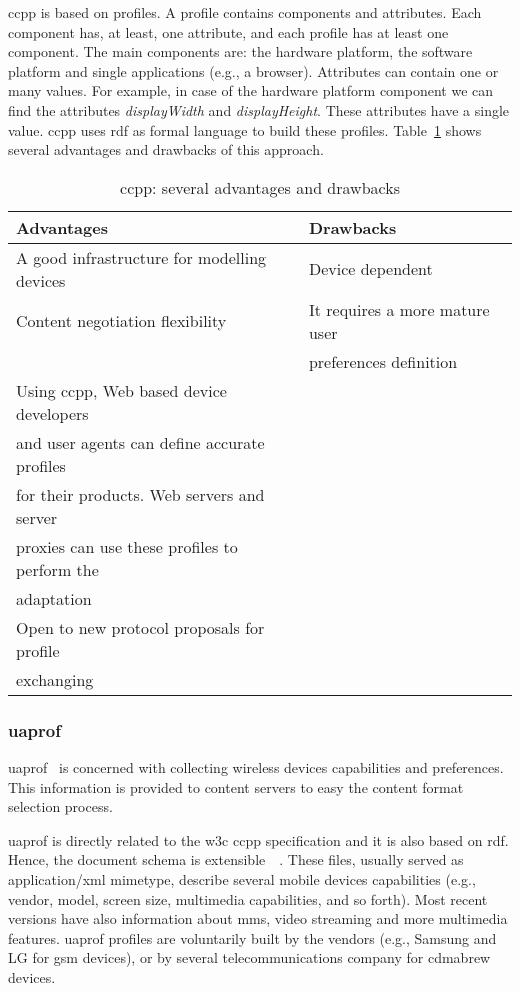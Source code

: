 \ac{ccpp} is based on profiles. A profile contains components and attributes.
Each component has, at least, one attribute, and each profile has at least one
component. The main components are: the hardware platform, the software platform
and single applications (e.g., a browser). Attributes can contain one or many 
values. For example, in case of the hardware platform component we can find the 
attributes \textit{displayWidth} and \textit{displayHeight}. These attributes 
have a single value. \ac{ccpp} uses \ac{rdf} as formal language to build these 
profiles. Table~\ref{tbl:ccpp} shows several advantages and drawbacks of this 
approach.



\begin{table}
\caption{\ac{ccpp}: several advantages and drawbacks}
\label{tbl:ccpp}
\footnotesize
\centering
\begin{tabular}{l l}
  \hline
  \textbf{Advantages}				& \textbf{Drawbacks}			\\
  \hline
  A good infrastructure for modelling devices 	& Device dependent 			\\
  Content negotiation flexibility 		& It requires a more mature user 	\\
						& preferences definition 		\\
  Using \ac{ccpp}, Web based device developers	& 					\\
  and user agents can define accurate profiles 	&					\\
  for their products. Web servers and server 	&					\\
  proxies can use these profiles to perform the &					\\
  adaptation					&					\\
  Open to new protocol proposals for profile 	&					\\
  exchanging					&					\\
  \hline
\end{tabular}
\end{table}

\subsubsection{\ac{uaprof}}
\label{sec:uaprof}
\ac{uaprof}~\citep{uaprof} is concerned with collecting wireless devices 
capabilities and preferences. This information is provided to content servers 
to easy the content format selection process. 

\ac{uaprof} is directly related to the \ac{w3c} \ac{ccpp} specification and it 
is also based on \ac{rdf}. Hence, the document schema is 
extensible~\citep{butler_implementing_2001}~\citep{butler_ccpp_2002}. These 
files, usually served as application/xml mimetype, describe several mobile 
devices capabilities (e.g., vendor, model, screen size, multimedia capabilities, 
and so forth). Most recent versions have also information about \ac{mms}, video streaming 
and more multimedia features. \ac{uaprof} profiles are voluntarily built by the 
vendors (e.g., Samsung and LG for \acs{gsm} devices), or by several 
telecommunications company for \acs{cdmabrew} devices.

